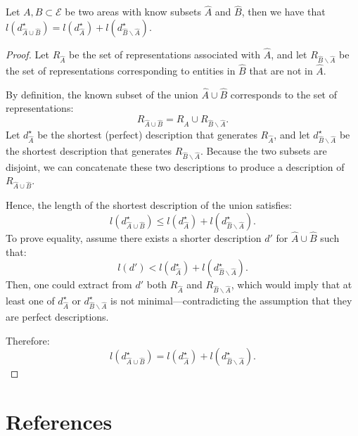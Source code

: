 \begin{proposition}
Let $A, B \subset \mathcal{E}$ be two areas with know subsets $\hat{A}$ and $\hat{B}$, then we have that $l \left( d_{\hat{A} \cup \hat{B}}^{\star} \right) = l \left( d_{\hat{A}}^{\star} \right) + l \left( d_{\hat{B} \backslash \hat{A}}^{\star} \right)$.
\end{proposition}
\begin{proof}
Let $R_{\hat{A}}$ be the set of representations associated with $\hat{A}$, and let $R_{\hat{B} \backslash \hat{A}}$ be the set of representations corresponding to entities in $\hat{B}$ that are not in $\hat{A}$.

By definition, the known subset of the union $\hat{A} \cup \hat{B}$ corresponds to the set of representations:
$$
R_{\hat{A} \cup \hat{B}} = R_{\hat{A}} \cup R_{\hat{B} \backslash \hat{A}}.
$$
Let $d_{\hat{A}}^{\star}$ be the shortest (perfect) description that generates $R_{\hat{A}}$, and let $d_{\hat{B} \backslash \hat{A}}^{\star}$ be the shortest description that generates $R_{\hat{B} \backslash \hat{A}}$. Because the two subsets are disjoint, we can concatenate these two descriptions to produce a description of $R_{\hat{A} \cup \hat{B}}$.

Hence, the length of the shortest description of the union satisfies:
$$
l \left( d_{\hat{A} \cup \hat{B}}^{\star} \right) \leq l \left( d_{\hat{A}}^{\star} \right) + l \left( d_{\hat{B} \backslash \hat{A}}^{\star} \right).
$$
To prove equality, assume there exists a shorter description $d'$ for $\hat{A} \cup \hat{B}$ such that:
$$
l(d') < l \left( d_{\hat{A}}^{\star} \right) + l \left( d_{\hat{B} \backslash \hat{A}}^{\star} \right).
$$
Then, one could extract from $d'$ both $R_{\hat{A}}$ and $R_{\hat{B} \backslash \hat{A}}$, which would imply that at least one of $d_{\hat{A}}^{\star}$ or $d_{\hat{B} \backslash \hat{A}}^{\star}$ is not minimal—contradicting the assumption that they are perfect descriptions.

Therefore:
$$
l \left( d_{\hat{A} \cup \hat{B}}^{\star} \right) = l \left( d_{\hat{A}}^{\star} \right) + l \left( d_{\hat{B} \backslash \hat{A}}^{\star} \right).
$$
\end{proof}


%
%

\section{References}

